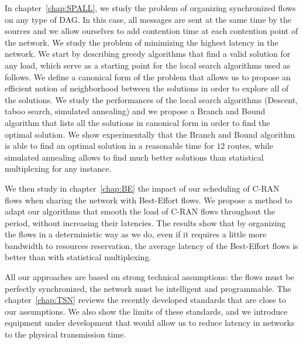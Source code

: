In chapter~\ref{chap:SPALL}, we study the problem of organizing synchronized flows on any type of DAG. In this case, all messages are sent at the same time by the sources and we allow ourselves to add contention time at each contention point of the network. We study the problem of minimizing the highest latency in the network. We start by describing greedy algorithms that find a valid solution for any load, which serve as a starting point for the local search algorithms used as follows. We define a canonical form of the problem that allows us to propose an efficient notion of neighborhood between the solutions in order to explore all of the solutions. We study the performances of the local search algorithms (Descent, taboo search, simulated annealing) and we propose a Branch and Bound algorithm that lists all the solutions in canonical form in order to find the optimal solution. We show experimentally that the Branch and Bound algorithm is able to find an optimal solution in a reasonable time for $12$ routes, while simulated annealing allows to find much better solutions than statistical multiplexing for any instance.

We then study in chapter~\ref{chap:BE} the impact of our scheduling of C-RAN flows when sharing the network with Best-Effort flows. We propose a method to adapt our algorithms that smooth the load of C-RAN flows throughout the period, without increasing their latencies. The results show that by organizing the flows in a deterministic way as we do, even if it requires a little more bandwidth to resources reservation, the average latency of the Best-Effort flows is better than with statistical multiplexing.

All our approaches are based on strong technical assumptions: the flows must be perfectly synchronized, the network must be intelligent and programmable. The chapter~\ref{chap:TSN} reviews the recently developed standards that are close to our assumptions. We also show the limits of these standards, and we introduce equipment under development that would allow us to reduce latency in networks to the physical transmission time.

